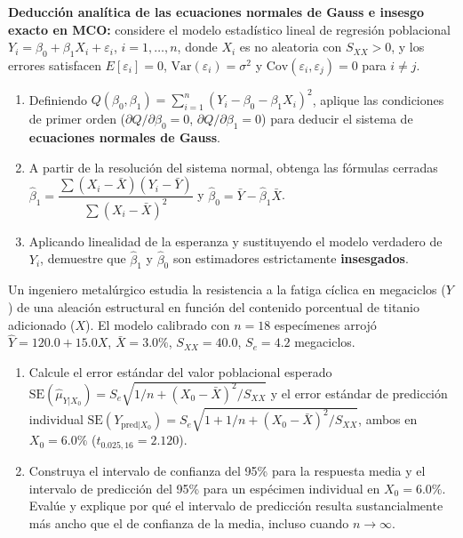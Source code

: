 \begin{problema}
	\label{prob:e97453b}
	\textbf{Deducción analítica de las ecuaciones normales de Gauss e insesgo exacto en MCO:} considere el modelo estadístico lineal de regresión poblacional $Y_i = \beta_0 + \beta_1 X_i + \varepsilon_i$, $i=1,\dots,n$, donde $X_i$ es no aleatoria con $S_{XX} > 0$, y los errores satisfacen $E[\varepsilon_i] = 0$, $\text{Var}(\varepsilon_i) = \sigma^2$ y $\text{Cov}(\varepsilon_i, \varepsilon_j) = 0$ para $i \neq j$.
	\begin{enumerate}
		\item Definiendo $Q(\beta_0, \beta_1) = \sum_{i=1}^n (Y_i - \beta_0 - \beta_1 X_i)^2$, aplique las condiciones de primer orden ($\partial Q/\partial\beta_0 = 0$, $\partial Q/\partial\beta_1=0$) para deducir el sistema de \textbf{ecuaciones normales de Gauss}.
		\item A partir de la resolución del sistema normal, obtenga las fórmulas cerradas $\hat{\beta}_1 = \dfrac{\sum(X_i-\bar{X})(Y_i-\bar{Y})}{\sum(X_i-\bar{X})^2}$ y $\hat{\beta}_0 = \bar{Y}-\hat{\beta}_1\bar{X}$.
		\item Aplicando linealidad de la esperanza y sustituyendo el modelo verdadero de $Y_i$, demuestre que $\hat{\beta}_1$ y $\hat{\beta}_0$ son estimadores estrictamente \textbf{insesgados}.
	\end{enumerate}
\end{problema}

\begin{problema}
	\label{prob:5c55133}
	Un ingeniero metalúrgico estudia la resistencia a la fatiga cíclica en megaciclos ($Y$) de una aleación estructural en función del contenido porcentual de titanio adicionado ($X$). El modelo calibrado con $n = 18$ especímenes arrojó $\hat{Y} = 120.0 + 15.0X$, $\bar{X} = 3.0\%$, $S_{XX} = 40.0$, $S_e = 4.2$ megaciclos.
	\begin{enumerate}
		\item Calcule el error estándar del valor poblacional esperado $\text{SE}(\hat{\mu}_{Y|X_0}) = S_e\sqrt{1/n + (X_0-\bar{X})^2/S_{XX}}$ y el error estándar de predicción individual $\text{SE}(Y_{\text{pred}|X_0}) = S_e\sqrt{1+1/n+(X_0-\bar{X})^2/S_{XX}}$, ambos en $X_0=6.0\%$ ($t_{0.025,16}=2.120$).
		\item Construya el intervalo de confianza del 95\% para la respuesta media y el intervalo de predicción del 95\% para un espécimen individual en $X_0=6.0\%$. Evalúe y explique por qué el intervalo de predicción resulta sustancialmente más ancho que el de confianza de la media, incluso cuando $n\to\infty$.
	\end{enumerate}
\end{problema}

